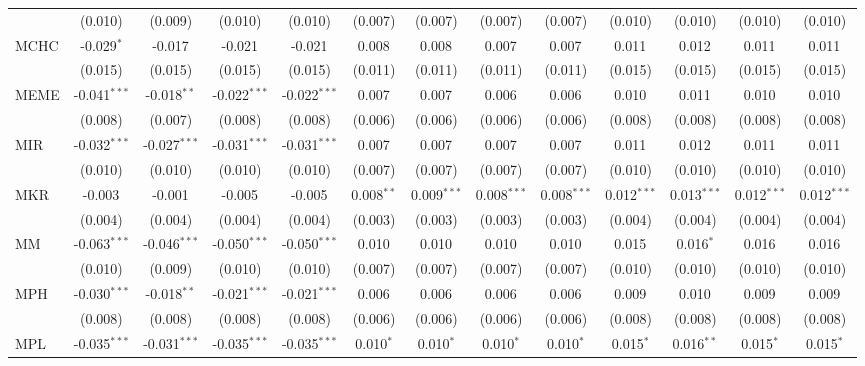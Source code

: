 \begin{table}[!htbp]
\begin{tabular}{@{\extracolsep{5pt}}lcccccccccccc}
  & (0.010) & (0.009) & (0.010) & (0.010) & (0.007) & (0.007) & (0.007) & (0.007) & (0.010) & (0.010) & (0.010) & (0.010) \\
 MCHC & -0.029$^{*}$ & -0.017$^{}$ & -0.021$^{}$ & -0.021$^{}$ & 0.008$^{}$ & 0.008$^{}$ & 0.007$^{}$ & 0.007$^{}$ & 0.011$^{}$ & 0.012$^{}$ & 0.011$^{}$ & 0.011$^{}$ \\
  & (0.015) & (0.015) & (0.015) & (0.015) & (0.011) & (0.011) & (0.011) & (0.011) & (0.015) & (0.015) & (0.015) & (0.015) \\
 MEME & -0.041$^{***}$ & -0.018$^{**}$ & -0.022$^{***}$ & -0.022$^{***}$ & 0.007$^{}$ & 0.007$^{}$ & 0.006$^{}$ & 0.006$^{}$ & 0.010$^{}$ & 0.011$^{}$ & 0.010$^{}$ & 0.010$^{}$ \\
  & (0.008) & (0.007) & (0.008) & (0.008) & (0.006) & (0.006) & (0.006) & (0.006) & (0.008) & (0.008) & (0.008) & (0.008) \\
 MIR & -0.032$^{***}$ & -0.027$^{***}$ & -0.031$^{***}$ & -0.031$^{***}$ & 0.007$^{}$ & 0.007$^{}$ & 0.007$^{}$ & 0.007$^{}$ & 0.011$^{}$ & 0.012$^{}$ & 0.011$^{}$ & 0.011$^{}$ \\
  & (0.010) & (0.010) & (0.010) & (0.010) & (0.007) & (0.007) & (0.007) & (0.007) & (0.010) & (0.010) & (0.010) & (0.010) \\
 MKR & -0.003$^{}$ & -0.001$^{}$ & -0.005$^{}$ & -0.005$^{}$ & 0.008$^{**}$ & 0.009$^{***}$ & 0.008$^{***}$ & 0.008$^{***}$ & 0.012$^{***}$ & 0.013$^{***}$ & 0.012$^{***}$ & 0.012$^{***}$ \\
  & (0.004) & (0.004) & (0.004) & (0.004) & (0.003) & (0.003) & (0.003) & (0.003) & (0.004) & (0.004) & (0.004) & (0.004) \\
 MM & -0.063$^{***}$ & -0.046$^{***}$ & -0.050$^{***}$ & -0.050$^{***}$ & 0.010$^{}$ & 0.010$^{}$ & 0.010$^{}$ & 0.010$^{}$ & 0.015$^{}$ & 0.016$^{*}$ & 0.016$^{}$ & 0.016$^{}$ \\
  & (0.010) & (0.009) & (0.010) & (0.010) & (0.007) & (0.007) & (0.007) & (0.007) & (0.010) & (0.010) & (0.010) & (0.010) \\
 MPH & -0.030$^{***}$ & -0.018$^{**}$ & -0.021$^{***}$ & -0.021$^{***}$ & 0.006$^{}$ & 0.006$^{}$ & 0.006$^{}$ & 0.006$^{}$ & 0.009$^{}$ & 0.010$^{}$ & 0.009$^{}$ & 0.009$^{}$ \\
  & (0.008) & (0.008) & (0.008) & (0.008) & (0.006) & (0.006) & (0.006) & (0.006) & (0.008) & (0.008) & (0.008) & (0.008) \\
 MPL & -0.035$^{***}$ & -0.031$^{***}$ & -0.035$^{***}$ & -0.035$^{***}$ & 0.010$^{*}$ & 0.010$^{*}$ & 0.010$^{*}$ & 0.010$^{*}$ & 0.015$^{*}$ & 0.016$^{**}$ & 0.015$^{*}$ & 0.015$^{*}$ \\

\end{tabular}
\end{table}
